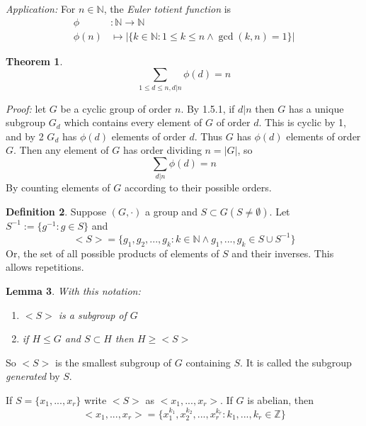 \documentclass{report}
\newtheorem{theorem}{Theorem}[subsection]
\newtheorem{lemma}[theorem]{Lemma}
\theoremstyle{remark}
\theoremstyle{definition}
\newtheorem{definition}[theorem]{Definition}
\theoremstyle{definition}
\theoremstyle{theorem}
\begin{document}
\emph{Application:} For $n \in \mathbb{N}$, the \emph{Euler totient function} is
\begin{align*}
    \phi&: \mathbb{N} \rightarrow \mathbb{N}\\
    \phi(n) &\mapsto |\{k \in \mathbb{N}: 1 \leq k \leq n \land \gcd(k,n)=1\}| 
\end{align*}
\begin{theorem}
\[\sum_{1\leq d \leq n, d|n}\phi(d)=n\]
\end{theorem}
\emph{Proof:} let $G$ be a cyclic group of order $n$. By 1.5.1, if $d|n$ then $G$ has a unique subgroup $G_d$ which contains every element of $G$ of order $d$. This is cyclic by \textcircled{\tiny{1}}, and by \textcircled{\tiny{2}} $G_d$ has $\phi(d)$ elements of order $d$. Thus $G$ has $\phi(d)$ elements of order $G$. Then any element of $G$ has order dividing $n=|G|$, so
\[\sum_{d|n}\phi(d)=n\]
By counting elements of $G$ according to their possible orders.
\begin{definition}
Suppose $(G, \cdot)$ a group and $S \subset G (S \neq \emptyset)$. Let $S^{-1}:=\{g^{-1}: g \in S\}$ and
\[<S>=\{g_1,g_2,...,g_k: k \in \mathbb{N} \land g_1,...,g_k \in S\cup S^{-1}\}\]
Or, the set of all possible products of elements of $S$ and their inverses. This allows repetitions.
\end{definition}
\begin{lemma}
With this notation:
\begin{enumerate}[label=\arabic*)]
    \item $<S>$ is a subgroup of $G$
    \item if $H \leq G$ and $S \subset H$ then $H \geq <S>$
\end{enumerate}
\end{lemma}
So $<S>$ is the smallest subgroup of $G$ containing $S$. It is called the subgroup \emph{generated} by $S$.\par
If $S=\{x_1,...,x_r\}$ write $<S>$ as $<x_1,...,x_r>$. If $G$ is abelian, then
\[<x_1,...,x_r> = \{x_1^{k_1}, x_2^{k_2},..., x_r^{k_r}: k_1,...,k_r \in \mathbb{Z}\}\]
\end{document}
